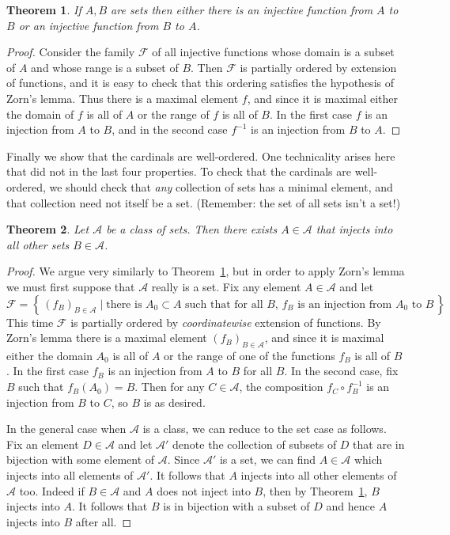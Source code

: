 \documentclass[11pt,oneside]{amsbook}
\newcommand{\set}[1]{\left\{\,#1\,\right\}}
\theoremstyle{definition}
\theoremstyle{plain}
\newtheorem{thm}{Theorem}[section]
\theoremstyle{definition}
\theoremstyle{remark}
\begin{document}
\begin{thm}
  \label{thm:card-total}
  If $A,B$ are sets then either there is an injective function from $A$ to $B$ or an injective function from $B$ to $A$.
\end{thm}

\begin{proof}
  Consider the family $\mathcal F$ of all injective functions whose domain is a subset of $A$ and whose range is a subset of $B$. Then $\mathcal F$ is partially ordered by extension of functions, and it is easy to check that this ordering satisfies the hypothesis of Zorn's lemma. Thus there is a maximal element $f$, and since it is maximal either the domain of $f$ is all of $A$ or the range of $f$ is all of $B$. In the first case $f$ is an injection from $A$ to $B$, and in the second case $f^{-1}$ is an injection from $B$ to $A$.
\end{proof}

Finally we show that the cardinals are well-ordered. One technicality arises here that did not in the last four properties. To check that the cardinals are well-ordered, we should check that \emph{any} collection of sets has a minimal element, and that collection need not itself be a set. (Remember: the set of all sets isn't a set!)

\begin{thm}
  \label{thm:card-well}
  Let $\mathcal A$ be a class of sets. Then there exists $A\in\mathcal A$ that injects into all other sets $B\in\mathcal A$.
\end{thm}

\begin{proof}
  We argue very similarly to Theorem~\ref{thm:card-total}, but in order to apply Zorn's lemma we must first suppose that $\mathcal A$ really is a set. Fix any element $A\in\mathcal A$ and let
\[\mathcal F=\set{(f_B)_{B\in\mathcal A}\mid\text{there is $A_0\subset A$ such that for all $B$, $f_B$ is an injection from $A_0$ to $B$}}
\]
This time $\mathcal F$ is partially ordered by \emph{coordinatewise} extension of functions. By Zorn's lemma there is a maximal element $(f_B)_{B\in\mathcal A}$, and since it is maximal either the domain $A_0$ is all of $A$ or the range of one of the functions $f_B$ is all of $B$. In the first case $f_B$ is an injection from $A$ to $B$ for all $B$. In the second case, fix $B$ such that $f_B(A_0)=B$. Then for any $C\in\mathcal A$, the composition $f_C\circ f_B^{-1}$ is an injection from $B$ to $C$, so $B$ is as desired.

In the general case when $\mathcal A$ is a class, we can reduce to the set case as follows. Fix an element $D\in\mathcal A$ and let $\mathcal A'$ denote the collection of subsets of $D$ that are in bijection with some element of $\mathcal A$. Since $\mathcal A'$ is a set, we can find $A\in\mathcal A$ which injects into all elements of $\mathcal A'$. It follows that $A$ injects into all other elements of $\mathcal A$ too. Indeed if $B\in\mathcal A$ and $A$ does not inject into $B$, then by Theorem~\ref{thm:card-total}, $B$ injects into $A$. It follows that $B$ is in bijection with a subset of $D$ and hence $A$ injects into $B$ after all.
\end{proof}
\end{document}
